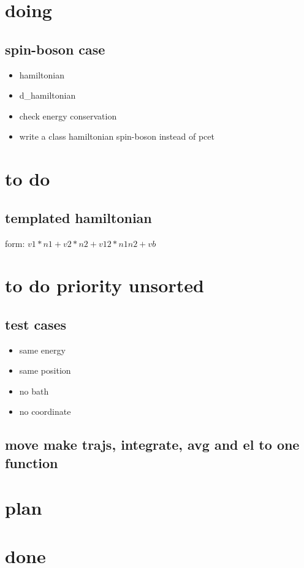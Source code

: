 \documentclass{article}
\let\Item\item
\renewcommand\item{\normalcolor\Item}
\newcommand\done{\color[RGB]{129, 180, 185} \ding{52} }
\begin{document}
\section{doing}
\subsection{spin-boson case}
\begin{itemize}
  \item \done hamiltonian
  \item \done d\_hamiltonian
  \item \done check energy conservation
  \item write a class hamiltonian spin-boson instead of pcet
\end{itemize}
\section{to do}
\subsection{templated hamiltonian}
form: $v1*n1+v2*n2+v12*n1n2+vb$
\section{to do priority unsorted}
\subsection{test cases}
\begin{itemize}
  \item same energy
  \item same position
  \item no bath
  \item no coordinate
\end{itemize}
\subsection{move make trajs, integrate, avg and el to one function}
\section{plan}
\section{done}
\end{document}
